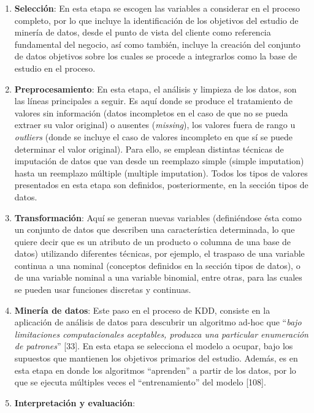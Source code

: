 \begin{enumerate}
\item \textbf{Selección}: En esta etapa se escogen las variables a considerar en el proceso completo, por lo que incluye la identiﬁcación de los objetivos del estudio de minería de datos, desde el punto de vista del cliente como referencia fundamental del negocio, así como también, incluye la creación del conjunto de datos objetivos sobre los cuales se procede a integrarlos como la base de estudio en el proceso.

\item \textbf{Preprocesamiento}: En esta etapa, el análisis y limpieza de los datos, son las líneas principales a seguir. Es aquí donde se produce el tratamiento de valores sin información (datos incompletos en el caso de que no se pueda extraer su valor original) o ausentes (\textit{missing}), los valores fuera de rango u \textit{outliers} (donde se incluye el caso de valores incompleto en que sí se puede determinar el valor original). Para ello, se emplean distintas técnicas de imputación de datos que van desde un reemplazo simple (simple imputation) hasta un reemplazo múltiple (multiple imputation). Todos los tipos de valores presentados en esta etapa son deﬁnidos, posteriormente, en la sección tipos de datos.

\item \textbf{Transformación}: Aquí se generan nuevas variables (definiéndose ésta como un conjunto de datos que describen una característica determinada, lo que quiere decir que es un atributo de un producto o columna de una base de datos) utilizando diferentes técnicas, por ejemplo, el traspaso de una variable continua a una nominal (conceptos definidos en la sección tipos de datos), o de una variable nominal a una variable binomial, entre otras, para las cuales se pueden usar funciones discretas y continuas.

\item \textbf{Minería de datos}: Este paso en el proceso de KDD, consiste en la aplicación de análisis de datos para descubrir un algoritmo ad-hoc que “\textit{bajo limitaciones computacionales aceptables, produzca una particular enumeración de patrones}” [33]. En esta etapa se selecciona el modelo a ocupar, bajo los supuestos que mantienen los objetivos primarios del estudio. Además, es en esta etapa en donde los algoritmos “aprenden” a partir de los datos, por lo que se ejecuta múltiples veces el “entrenamiento” del modelo [108].

\item \textbf{Interpretación y evaluación}:

\end{enumerate}

